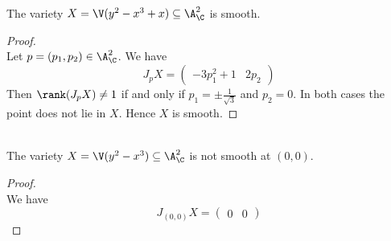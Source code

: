 \documentclass[a4paper]{article}
\begin{document}
\begin{eg}{}{}\\
The variety $X=\V(y^2-x^3+x)\subseteq\A_\C^2$ is smooth. 
\begin{proof}\\
Let $p=(p_1,p_2)\in\A_\C^2$. We have $$J_pX=\begin{pmatrix}-3p_1^2+1 & 2p_2\end{pmatrix}$$ Then $\rank(J_pX)\neq 1$ if and only if $p_1=\pm\frac{1}{\sqrt{3}}$ and $p_2=0$. In both cases the point does not lie in $X$. Hence $X$ is smooth. 
\end{proof}
\end{eg}

\begin{eg}{}{}\\
The variety $X=\V(y^2-x^3)\subseteq\A_\C^2$ is not smooth at $(0,0)$. 
\begin{proof}\\
We have $$J_{(0,0)}X=\begin{pmatrix}0 & 0\end{pmatrix}$$
\end{proof}
\end{eg}
\end{document}
